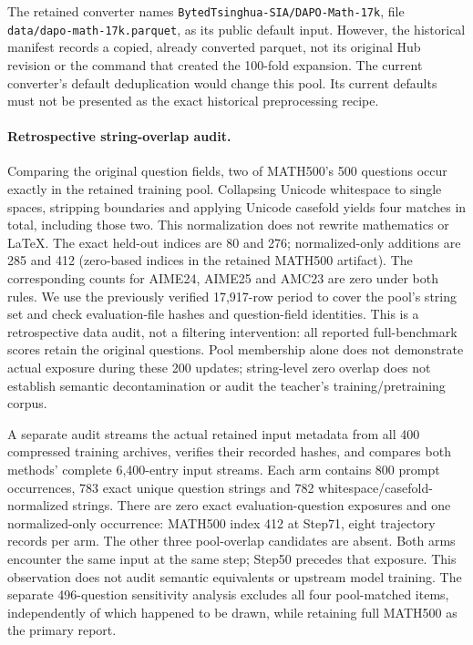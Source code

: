 The retained converter names \texttt{BytedTsinghua-SIA/DAPO-Math-17k}, file \texttt{data/dapo-math-17k.parquet}, as its public default input. However, the historical manifest records a copied, already converted parquet, not its original Hub revision or the command that created the 100-fold expansion. The current converter's default deduplication would change this pool. Its current defaults must not be presented as the exact historical preprocessing recipe.

\paragraph{Retrospective string-overlap audit.}
Comparing the original question fields, two of MATH500's 500 questions occur exactly in the retained training pool. Collapsing Unicode whitespace to single spaces, stripping boundaries and applying Unicode casefold yields four matches in total, including those two. This normalization does not rewrite mathematics or LaTeX. The exact held-out indices are 80 and 276; normalized-only additions are 285 and 412 (zero-based indices in the retained MATH500 artifact). The corresponding counts for AIME24, AIME25 and AMC23 are zero under both rules. We use the previously verified 17,917-row period to cover the pool's string set and check evaluation-file hashes and question-field identities. This is a retrospective data audit, not a filtering intervention: all reported full-benchmark scores retain the original questions. Pool membership alone does not demonstrate actual exposure during these 200 updates; string-level zero overlap does not establish semantic decontamination or audit the teacher's training/pretraining corpus.

A separate audit streams the actual retained input metadata from all 400 compressed training archives, verifies their recorded hashes, and compares both methods' complete 6,400-entry input streams. Each arm contains 800 prompt occurrences, 783 exact unique question strings and 782 whitespace/casefold-normalized strings. There are zero exact evaluation-question exposures and one normalized-only occurrence: MATH500 index 412 at Step71, eight trajectory records per arm. The other three pool-overlap candidates are absent. Both arms encounter the same input at the same step; Step50 precedes that exposure. This observation does not audit semantic equivalents or upstream model training. The separate 496-question sensitivity analysis excludes all four pool-matched items, independently of which happened to be drawn, while retaining full MATH500 as the primary report.

